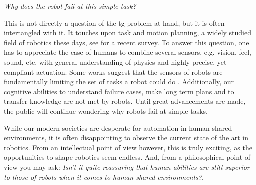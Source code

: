 \textit{Why does the robot fail at this simple task?}

This is not directly a question of the \ac{tg} problem at
hand, but it is often intertangled with it. It touches upon
task and motion planning, a widely studied field of robotics
these days, see \cite{garrett2021integrated} for a recent
survey. To answer this question, one has to appreciate the
ease of humans to combine several sensors, e.g. vision,
feel, sound, etc. with general understanding of physics and
highly precise, yet compliant actuation. Some works suggest
that the sensors of robots are fundamentally limiting the set of
tasks a robot could do \cite{majumdar2023fundamental}.
Additionally, our cognitive abilities to understand failure
cases, make long term plans and to transfer knowledge are
not met by robots. Until great advancements are made, the
public will continue wondering why robots fail at simple
tasks.

While our modern societies are desperate for automation in human-shared
environments, it is often disappointing to observe the current state of the art
in robotics. From an intellectual point of view however, this is truly exciting,
as the opportunities to shape robotics seem endless. And, from a philosophical
point of view you may ask: \textit{Isn't it quite reassuring that human
abilities are still superior to those of robots when it
comes to human-shared environments?}.
